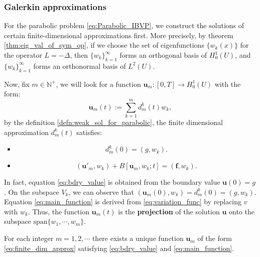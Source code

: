 \subsubsection{Galerkin approximations}
For the parabolic problem \eqref{eq:Parabolic_IBVP}, we construct the solutions of certain finite-dimensional approximations first. More precisely, by theorem \ref{thm:eig_val_of_sym_op}, if we choose the set of eigenfunctions $\{w_{k}(x)\}$ for the operator $L=-\Delta$, then $\{w_{k}\}_{k=1}^{\infty}$ forms an orthogonal basis of $H_{0}^{1}(U)$, and $\{w_{k}\}_{k=1}^{\infty}$ forms an orthonormal basis of $L^{2}(U)$.

Now, fix $m\in\mathbb{N}^{+}$, we will look for a function $\mathbf{u}_{m}:[0,T]\rightarrow H_{0}^{1}(U)$ with the form:
\begin{equation}
    \label{eq:finite_dim_approx}
    \mathbf{u}_{m}(t):=\sum_{k=1}^{m}d_{m}^{k}(t)w_{k},
\end{equation}
by the definition \ref{defn:weak_sol_for_parabolic}, the finite dimensional approximation $d_{m}^{k}(t)$ satisfies:
\begin{itemize}
    \item 
    \begin{equation}
        \label{eq:bdry_value}
        d_{m}^{k}(0)=(g,w_{k}).
    \end{equation}
    \item 
    \begin{equation}
        \label{eq:main_function}
        (\mathbf{u}'_{m},w_{k})+B[\mathbf{u}_{m},w_{k};t]=(\mathbf{f},w_{k}).    
    \end{equation}
\end{itemize}
In fact, equation \eqref{eq:bdry_value} is obtained from the boundary value $\mathbf{u}(0) = g$. On the subspace $V_{k}$, we can observe that $(\mathbf{u}_{m}(0),w_{k}) = d_{m}^{k}(0) = (g, w_{k})$. Equation \eqref{eq:main_function} is derived from \eqref{eq:variation_func} by replacing $v$ with $w_{k}$. Thus, the function $\mathbf{u}_{m}(t)$ is the \textbf{projection} of the solution $\mathbf{u}$ onto the subspace $\text{span}\{w_{1},\cdots,w_{m}\}$.
\begin{theorem}
    For each integer $m=1,2,\cdots$ there exists a unique function $\mathbf{u}_{m}$ of the form \eqref{eq:finite_dim_approx} satisfying \eqref{eq:bdry_value} and \eqref{eq:main_function}.
\end{theorem}
